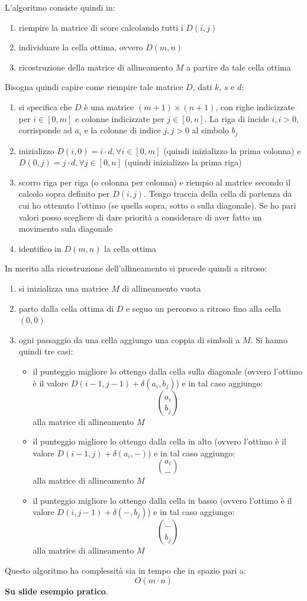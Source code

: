 \documentclass[a4paper,12pt, oneside]{book}
\begin{document}
L'algoritmo consiste quindi in:
\begin{enumerate}
  \item riempire la matrice di score calcolando tutti i $D(i,j)$
  \item individuare la cella ottima, ovvero $D(m,n)$
  \item ricostruzione della matrice di allineamento $M$ a partire da tale cella
  ottima 
\end{enumerate}
Bisogna quindi capire come riempire tale matrice $D$, dati $k$, $s$ e $d$:
\begin{enumerate}
  \item si specifica che $D$ è una matrice $(m+1)\times(n+1)$, con righe
  indicizzate per $i\in[0,m]$ e colonne indicizzate per $j\in[0,n]$. La riga di
  incide $i,i>0$, corrisponde ad $a_i$ e la colonne di indice $j,j>0$ al simbolo
  $b_j$ 
  \item inizializzo $D(i,0)=i\cdot d, \forall i\in[0,m]$ (quindi inizializzo la
  prima colonna) e $D(0,j)=j\cdot d, \forall j\in[0,n]$ (quindi inizializzo la
  prima riga)
  \item scorro riga per riga (o colonna per colonna) e riempio al matrice
  secondo il calcolo sopra 
  definito per $D(i,j)$. Tengo traccia della cella di partenza da cui ho
  ottenuto l'ottimo (se quella sopra, sotto o sulla diagonale). Se ho pari
  valori posso scegliere di dare priorità a considerare di aver fatto un
  movimento sula diagonale
  \item identifico in $D(m,n)$ la cella ottima
\end{enumerate}
In merito alla ricostruzione dell'allineamento si procede quindi a ritroso:
\begin{enumerate}
  \item si inizializza una matrice $M$ di allineamento vuota
  \item parto dalla cella ottima di $D$ e seguo un percorso a ritroso fino alla
  cella $(0,0)$
  \item ogni passaggio da una cella aggiungo una coppia di simboli a $M$.
  Si hanno quindi tre casi:
  \begin{itemize}
    \item il punteggio migliore lo ottengo dalla cella sulla diagonale (ovvero
    l'ottimo è il valore $D(i-1,j-1)+\delta(a_i,b_j)$) e in tal
    caso aggiungo:
    \[{{a_i}\choose{b_j}}\]
    alla matrice di allineamento $M$
    \item il punteggio migliore lo ottengo dalla cella in alto (ovvero
    l'ottimo è il valore $D(i-1,j)+\delta(a_i,-)$) e in tal caso
    aggiungo:
    \[{{a_i}\choose{-}}\]
    alla matrice di allineamento $M$
    \item il punteggio migliore lo ottengo dalla cella in basso (ovvero
    l'ottimo è il valore $D(i,j-1)+\delta(-,b_j)$) e in tal caso
    aggiungo:
    \[{{-}\choose{b_j}}\]
    alla matrice di allineamento $M$
  \end{itemize}
\end{enumerate}
Questo algoritmo ha complessità sia in tempo che in spazio pari a:
\[O(m\cdot n)\]
\textbf{Su slide esempio pratico}.
\end{document}
